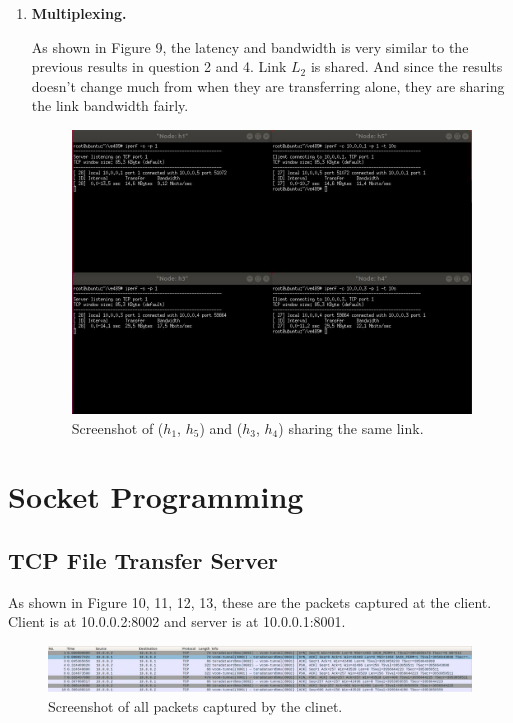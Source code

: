 \documentclass[a4paper]{article}
\begin{document}
\begin{enumerate}
\item
\textbf{Multiplexing.}
\par
As shown in Figure 9, the latency and bandwidth is very similar to the previous results in question 2 and 4. Link $L_2$ is shared. And since the results doesn't change much from when they are transferring alone, they are sharing the link bandwidth fairly.
\begin{figure}[htbp]
\centering
\includegraphics[scale=1]{9.jpg}
\caption{Screenshot of ($h_1$, $h_5$) and ($h_3$, $h_4$) sharing the same link.}
\end{figure}

\end{enumerate}
\section{Socket Programming}
\subsection{TCP File Transfer Server}
\noindent
\par
As shown in Figure 10, 11, 12, 13, these are the packets captured at the client. Client is at 10.0.0.2:8002 and server is at 10.0.0.1:8001.

\begin{figure}[htbp]
\centering
\includegraphics[scale=0.55]{12.jpg}
\caption{Screenshot of all packets captured by the clinet.}
\end{figure}
\end{document}
